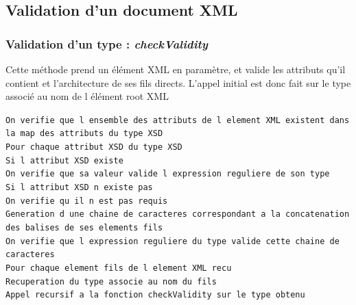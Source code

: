 \pagebreak

\subsection{Validation d'un document XML}
	\subsubsection{Validation d'un type : \textit{checkValidity}}
		Cette méthode prend un élément XML en paramètre, et valide les attributs qu'il contient et l'architecture de ses fils directs.
		L'appel initial est donc fait sur le type associé au nom de l élément root XML

		\lstinline$On verifie que l ensemble des attributs de l element XML existent dans la map des attributs du type XSD$\\
		\lstinline$Pour chaque attribut XSD du type XSD$\\
		\indent \lstinline$Si l attribut XSD existe$\\
		\indent \indent \lstinline$On verifie que sa valeur valide l expression reguliere de son type$\\
		\indent \lstinline$Si l attribut XSD n existe pas$\\
		\indent \indent \lstinline$On verifie qu il n est pas requis$\\

		\lstinline$Generation d une chaine de caracteres correspondant a la concatenation des balises de ses elements fils$\\
		\lstinline$On verifie que l expression reguliere du type valide cette chaine de caracteres$\\

		\lstinline$Pour chaque element fils de l element XML recu$\\
		\indent \lstinline$Recuperation du type associe au nom du fils$\\
		\indent \lstinline$Appel recursif a la fonction checkValidity sur le type obtenu$\\

